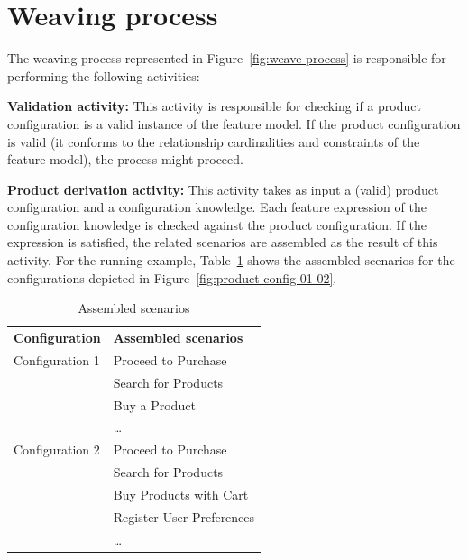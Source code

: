 \documentclass[11pt]{report}
\begin{document}
\section{Weaving process}\label{sub:wp}

The weaving process represented in Figure~\ref{fig:weave-process} is responsible for performing the following activities: 

{\bf Validation activity:} This activity is responsible for checking if a product configuration is a valid instance of the feature model. If the product configuration is 
valid (it conforms to the relationship cardinalities and constraints of the feature model), the process might proceed. 

{\bf Product derivation activity:} This activity takes as input a (valid) product configuration and a configuration knowledge. 
Each feature expression of the configuration knowledge is checked against the product configuration. If the expression 
is satisfied, the related scenarios are assembled as the result of this activity. For the running example, 
Table~\ref{tab:assembled-scenarios} shows the assembled scenarios for the configurations depicted in Figure~\ref{fig:product-config-01-02}.

\begin{table}[h]
\begin{center}
 \caption{Assembled scenarios} \label{tab:assembled-scenarios}
\begin{tabular}{ll}
   \hline\noalign{\smallskip}
  {\bf Configuration} & {\bf Assembled scenarios} \\
   \noalign{\smallskip}
   \hline
   \noalign{\smallskip}
    Configuration 1\hspace{15pt} & Proceed to Purchase \\
                                                   & Search for Products \\
                                                   & Buy a Product \\
                             			  & \ldots \\
   Configuration 2                        & Proceed to Purchase \\
                             			  & Search for Products	 \\
			                           & Buy Products with Cart \\
                                                   & Register User Preferences \\
                             & \ldots       \\
  \hline
\end{tabular}
\end{center}
\end{table}
 
\end{document}
